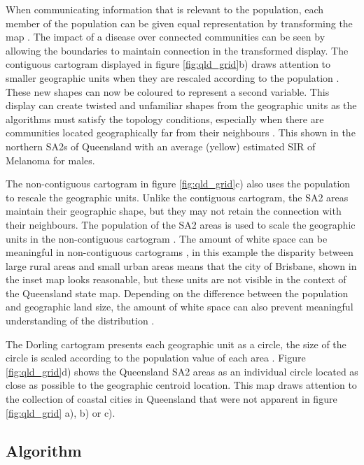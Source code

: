 When communicating information that is relevant to the population, each
member of the population can be given equal representation by
transforming the map \citep{TVSSS}. The impact of a disease over
connected communities can be seen by allowing the boundaries to maintain
connection in the transformed display. The contiguous cartogram
displayed in figure \ref{fig:qld_grid}b) draws attention to smaller
geographic units when they are rescaled according to the population
\citep{DMAHP}. These new shapes can now be coloured to represent a
second variable. This display can create twisted and unfamiliar shapes
from the geographic units as the algorithms must satisfy the topology
conditions, especially when there are communities located geographically
far from their neighbours \citep{TVSSS}. This shown in the northern SA2s
of Queensland with an average (yellow) estimated SIR of Melanoma for
males.

The non-contiguous cartogram in figure \ref{fig:qld_grid}c) also uses
the population to rescale the geographic units. Unlike the contiguous
cartogram, the SA2 areas maintain their geographic shape, but they may
not retain the connection with their neighbours. The population of the
SA2 areas is used to scale the geographic units in the non-contiguous
cartogram \citep{NAC}. The amount of white space can be meaningful in
non-contiguous cartograms \citep{ECGC}, in this example the disparity
between large rural areas and small urban areas means that the city of
Brisbane, shown in the inset map looks reasonable, but these units are
not visible in the context of the Queensland state map. Depending on the
difference between the population and geographic land size, the amount
of white space can also prevent meaningful understanding of the
distribution \citep{TVSSS}.

The Dorling cartogram presents each geographic unit as a circle, the
size of the circle is scaled according to the population value of each
area \citep{ACTUC}. Figure \ref{fig:qld_grid}d) shows the Queensland SA2
areas as an individual circle located as close as possible to the
geographic centroid location. This map draws attention to the collection
of coastal cities in Queensland that were not apparent in figure
\ref{fig:qld_grid} a), b) or c).

\hypertarget{algorithm}{%
\subsection{Algorithm}\label{algorithm}}

